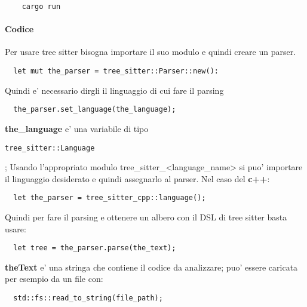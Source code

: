 \begin{verbatim}
	cargo run
\end{verbatim}

\paragraph{Codice}

Per usare tree sitter bisogna importare il suo modulo e quindi creare un parser.

\begin{verbatim}
  let mut the_parser = tree_sitter::Parser::new():
\end{verbatim}

Quindi e' necessario dirgli il linguaggio di cui fare il parsing

\begin{verbatim}
  the_parser.set_language(the_language);
\end{verbatim}

\textbf{the\_language} e' una variabile di tipo \begin{verbatim}tree_sitter::Language\end{verbatim};
Usando l'appropriato modulo tree\_sitter\_<language\_name> si puo' importare il linguaggio desiderato e quindi assegnarlo al parser.
Nel caso del \textbf{c++}:

\begin{verbatim}
  let the_parser = tree_sitter_cpp::language();
\end{verbatim}

Quindi per fare il parsing e ottenere un albero con il DSL di tree sitter basta usare:

\begin{verbatim}
  let tree = the_parser.parse(the_text);
\end{verbatim}

\textbf{theText} e' una stringa che contiene il codice da analizzare; puo' essere caricata per esempio da un file con:

\begin{verbatim}
  std::fs::read_to_string(file_path);
\end{verbatim}
